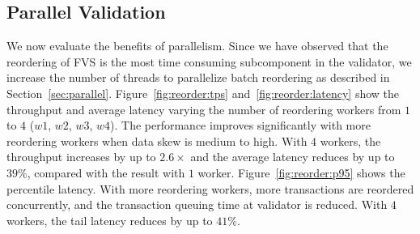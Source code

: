 
\subsection{Parallel Validation}
\label{sec:experiments:parallel}


We now evaluate the benefits of parallelism. Since we have observed that the reordering of FVS is the most time consuming subcomponent in the validator, we increase the number of threads to parallelize batch reordering as described in Section~\ref{sec:parallel}. 
Figure~\ref{fig:reorder:tps} and~\ref{fig:reorder:latency} show the throughput
and average latency varying the number of reordering workers from $1$ to $4$
($w1$, $w2$, $w3$, $w4$). The performance improves significantly with more reordering workers when data skew is medium to high. With $4$ workers, the throughput increases by up to $2.6\times$ and the average latency reduces by up to $39\%$, compared with the result with $1$ worker. Figure~\ref{fig:reorder:p95} shows the percentile latency. With more reordering workers, more transactions are reordered concurrently, and the transaction queuing time at validator is reduced. With $4$ workers, the tail latency reduces by up to $41\%$.

